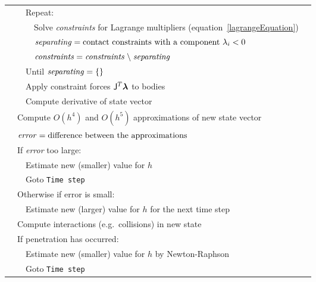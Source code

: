 \begin{figure}
\begin{tabular}{|l|l|l|l|@{}l}
        &&\multicolumn{2}{|l|}{Repeat:}\\\cline{4-4}
            &&&Solve \textit{constraints} for Lagrange multipliers (equation~\ref{lagrangeEquation})\\\cline{4-4}
            &&&$\mbox{\textit{separating}} = \mbox{contact constraints with a component } \lambda_i < 0$&
            \curly{\ref{restingContact}}{\spx\spx\spx\spx\spx\spx\spx}\\\cline{4-4}
            &&&$\mbox{\textit{constraints}} = \mbox{\textit{constraints}} \;\backslash\;
            \mbox{\textit{separating}}$\\\cline{4-4}
        &&\multicolumn{2}{|l|}{Until $\mbox{\textit{separating}} = \{\}$}\\\cline{3-4}
        &&\multicolumn{2}{|l|}{Apply constraint forces $\m{J}^T\ve{\lambda}$ to bodies}\\\cline{3-4}
        &&\multicolumn{2}{|l|}{Compute derivative of state vector}&
        \curly{\ref{rigidBodyDynamics}}{\spx}\\\cline{2-4}
    &\multicolumn{3}{|l|}{Compute $O(h^4)$ and $O(h^5)$ approximations of new state vector}\\\cline{2-4}
    &\multicolumn{3}{|l|}{$\mbox{\textit{error}} = \mbox{difference between the approximations}$}\\\cline{2-4}
    &\multicolumn{3}{|l|}{If \textit{error} too large:}\\\cline{3-4}
        &&\multicolumn{2}{|l|}{Estimate new (smaller) value for $h$}&
        \curly{\ref{solvingODEs}}{\spx\spx\spx\spx\spx\spx\spx}\\\cline{3-4}
        &&\multicolumn{2}{|l|}{Goto \texttt{Time step}}\\\cline{2-4}
    &\multicolumn{3}{|l|}{Otherwise if error is small:}\\\cline{3-4}
        &&\multicolumn{2}{|l|}{Estimate new (larger) value for $h$ for the next time step}\\\cline{2-4}
    &\multicolumn{3}{|l|}{Compute interactions (e.g.\ collisions) in new state}&
    \curly{\ref{meshIntersection}}{\spx}\\\cline{2-4}
    &\multicolumn{3}{|l|}{If penetration has occurred:}\\\cline{3-4}
        &&\multicolumn{2}{|l|}{Estimate new (smaller) value for $h$ by Newton-Raphson}&
        \curly{\ref{findingContactTime}}{\spx\spx\spx}\\\cline{3-4}
        &&\multicolumn{2}{|l|}{Goto \texttt{Time step}}\\\cline{2-4}

\end{tabular}
\end{figure}
